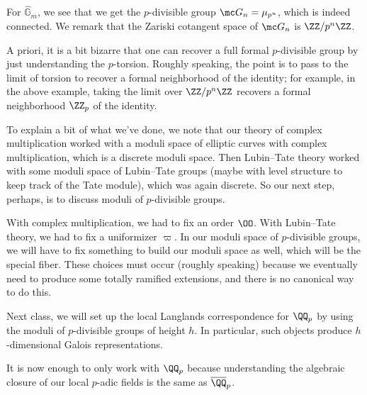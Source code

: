 \documentclass[../notes.tex]{subfiles}
\begin{document}
\begin{example}
	For $\widehat{\mathbb G}_m$, we see that we get the $p$-divisible group $\mc G_n=\mu_{p^n}$, which is indeed connected. We remark that the Zariski cotangent space of $\mc G_n$ is $\ZZ/p^n\ZZ$.
\end{example}
A priori, it is a bit bizarre that one can recover a full formal $p$-divisible group by just understanding the $p$-torsion. Roughly speaking, the point is to pass to the limit of torsion to recover a formal neighborhood of the identity; for example, in the above example, taking the limit over $\ZZ/p^n\ZZ$ recovers a formal neighborhood $\ZZ_p$ of the identity.

To explain a bit of what we've done, we note that our theory of complex multiplication worked with a moduli space of elliptic curves with complex multiplication, which is a discrete moduli space. Then Lubin--Tate theory worked with some moduli space of Lubin--Tate groups (maybe with level structure to keep track of the Tate module), which was again discrete. So our next step, perhaps, is to discuss moduli of $p$-divisible groups.
\begin{remark}
	With complex multiplication, we had to fix an order $\OO$. With Lubin--Tate theory, we had to fix a uniformizer $\varpi$. In our moduli space of $p$-divisible groups, we will have to fix something to build our moduli space as well, which will be the special fiber. These choices must occur (roughly speaking) because we eventually need to produce some totally ramified extensions, and there is no canonical way to do this.
\end{remark}
Next class, we will set up the local Langlands correspondence for $\QQ_p$ by using the moduli of $p$-divisible groups of height $h$. In particular, such objects produce $h$-dimensional Galois representations.
\begin{remark}
	It is now enough to only work with $\QQ_p$ because understanding the algebraic closure of our local $p$-adic fields is the same as $\overline{\QQ}_p$.
\end{remark}
\end{document}
